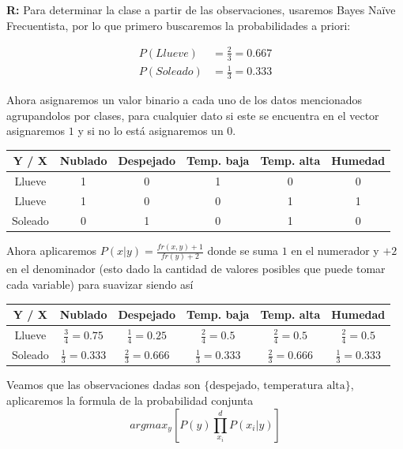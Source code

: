 \textbf{R:} Para determinar la clase a partir de las observaciones, usaremos Bayes Naïve Frecuentista, por lo que primero buscaremos la probabilidades a priori:

\begin{align*} %
    P(Llueve) & = \frac{2}{3} = 0.667\\
    P(Soleado) & = \frac{1}{3} = 0.333
\end{align*}

Ahora asignaremos un valor binario a cada uno de los datos mencionados agrupandolos por clases, para cualquier dato si este se encuentra en el vector asignaremos $1$ y si no lo está asignaremos un $0$.
\begin{center}
    \begin{tabular}{c|c|c|c|c|c}
    Y / X & Nublado & Despejado & Temp. baja & Temp. alta & Humedad\\
     \hline
    Llueve  & 1 & 0 & 1 & 0 & 0 \\
    \hline
    Llueve  & 1 & 0 & 0 & 1 & 1 \\
    \hline
    Soleado & 0 & 1 & 0 & 1 & 0
\end{tabular}
\end{center}

Ahora aplicaremos $P(x|y)=\frac{fr(x,y)+1}{fr(y)+2}$ donde se suma $1$ en el numerador y $+2$ en el denominador   (esto dado la cantidad de valores posibles que puede tomar cada variable) para suavizar siendo así

\begin{center}
    \begin{tabular}{c|c|c|c|c|c}
    Y / X & Nublado & Despejado & Temp. baja & Temp. alta & Humedad\\
     \hline
    Llueve  & $\frac{3}{4}=0.75$ & $\frac{1}{4} = 0.25$ & $\frac{2}{4} = 0.5$ & $\frac{2}{4} =0.5$ & $\frac{2}{4} = 0.5$ \\
    \hline
    Soleado & $\frac{1}{3} = 0.333$ & $\frac{2}{3} = 0.666$ & $\frac{1}{3} = 0 .333$ & $\frac{2}{3} = 0.666$ & $\frac{1}{3} = 0.333$
\end{tabular}
\end{center}

Veamos que las observaciones dadas son $\{\text{despejado, temperatura alta}\}$, aplicaremos la formula de la probabilidad conjunta
\[argmax_y [ P(y) \prod_{x_i}^{d} P(x_i | y)]\]

